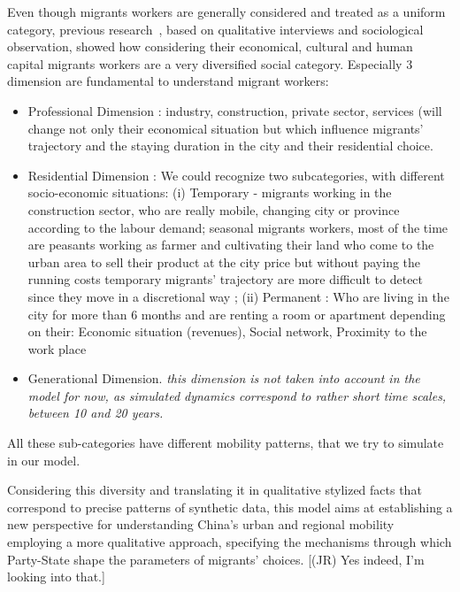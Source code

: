 Even though migrants workers are generally considered and treated as a uniform category, previous research~\cite{losavio2016analyser}, based on qualitative interviews and sociological observation, showed how considering their economical, cultural and human capital migrants workers are a very diversified social category. Especially 3 dimension are fundamental to understand migrant workers:
\begin{itemize}
\item Professional Dimension : industry, construction, private sector, services (will change not only their economical situation but which influence  migrants’ trajectory and the staying duration in the city and their residential choice.
\item Residential Dimension : We could recognize two subcategories, with different socio-economic situations: (i) Temporary - migrants working in the construction sector, who are really mobile, changing city or province according to the labour demand;  seasonal migrants workers, most of the time are peasants working as farmer and cultivating their land who come to the urban area to sell their product at the city price but without paying the running costs temporary migrants’ trajectory are more difficult to detect since they move in a discretional way ; (ii) Permanent :  Who are living in the city for more than 6 months and are renting a room or apartment depending on their: Economic situation (revenues), Social network, Proximity to the work place
\item Generational Dimension. \textit{this dimension is not taken into account in the model for now, as simulated dynamics correspond to rather short time scales, between 10 and 20 years.}
\end{itemize}


All these sub-categories have different mobility patterns, that we try to simulate in our model.

Considering this diversity and translating it in qualitative stylized facts that correspond to precise patterns of synthetic data, this model aims at establishing a new perspective for understanding China’s urban and regional mobility employing a more qualitative approach, specifying the mechanisms through which Party-State shape the parameters of migrants’ choices. [(JR) Yes indeed, I'm looking into that.]





